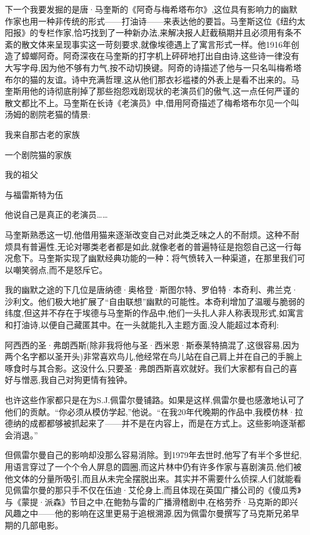 下一个我要发掘的是唐·马奎斯的《阿奇与梅希塔布尔》,这位具有影响力的幽默作家也用一种非传统的形式——打油诗——来表达他的要旨。马奎斯这位《纽约太阳报》的专栏作家,恰巧找到了一种新办法,来解决报人赶截稿期并且必须用有条不紊的散文体来呈现事实这一苛刻要求,就像埃德遇上了寓言形式一样。他1916年创造了蟑螂阿奇。阿奇深夜在马奎斯的打字机上砰砰地打出自由诗,这些诗一律没有大写字母,因为他不够有力气,按不动切换键。阿奇的诗描述了他与一只名叫梅希塔布尔的猫的友谊。诗中充满哲理,这从他们那衣衫褴褛的外表上是看不出来的。马奎斯用他的诗彻底削掉了那些抱怨戏剧现状的老演员们的傲气,这一点任何严谨的散文都比不上。马奎斯在长诗《老演员》中,借用阿奇描述了梅希塔布尔见一个叫汤姆的剧院老猫的情景:

我来自那古老的家族

一个剧院猫的家族

我的祖父

与福雷斯特为伍

他说自己是真正的老演员……

马奎斯熟悉这一切,他借用猫来逐渐改变自己对此类乏味之人的不耐烦。这种不耐烦具有普遍性,无论对哪类老者都是如此,就像老者的普遍特征是抱怨自己这一行每况愈下。马奎斯实现了幽默经典功能的一种：将气愤转入一种渠道，在那里我们可以嘲笑弱点,而不是怒斥它。

我的幽默之途的下几位是唐纳德·奥格登·斯图尔特、罗伯特·本奇利、弗兰克·沙利文。他们极大地扩展了“自由联想”幽默的可能性。本奇利增加了温暖与脆弱的纬度,但这并不存在于埃德与马奎斯的作品中,他们一头扎人非人称表现形式,如寓言和打油诗,以便自己藏匿其中。在一头就能扎入主题方面,没人能超过本奇利:

阿西西的圣·弗朗西斯(除非我将他与圣·西米恩·斯泰莱特搞混了,这很容易,因为两个名字都以圣开头)非常喜欢鸟儿,他经常在鸟儿站在自己肩上并在自己的手腕上啄食时与其合影。这没什么,只要圣·弗朗西斯喜欢就好。我们大家都有自己的喜好与憎恶,我自己对狗更情有独钟。

也许这些作家都只是在为S.J.佩雷尔曼铺路。如果是这样,佩雷尔曼也感激地认可了他们的贡献。“你必须从模仿学起,”他说。“在我20年代晚期的作品中,我模仿林·拉德纳的成都都够被抓起来了——并不是在内容上，而是在方式上。这些影响逐渐都会消退。”

但佩雷尔曼自己的影响却没那么容易消除。到1979年去世时,他写了有半个多世纪,用语言穿过了一个个令人屏息的圆圈,而这片林中仍有许多作家与喜剧演员,他们被他文体的分量所吸引,而且从未完全摆脱出来。其实并不需要什么侦探,人们就能看见佩雷尔曼的那只手不仅在伍迪·艾伦身上,而且体现在英国广播公司的《傻瓜秀》与《蒙提·派森》节目之中,在鲍勃与雷的广播滑稽剧中,在格劳乔·马克斯的即兴风趣之中——他的影响在这里更易于追根溯源,因为佩雷尔曼撰写了马克斯兄弟早期的几部电影。

